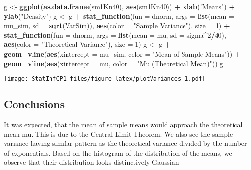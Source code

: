 \documentclass[]{article}
\newenvironment{Shaded}{\begin{snugshade}}{\end{snugshade}}
\newcommand{\DataTypeTok}[1]{\textcolor[rgb]{0.13,0.29,0.53}{#1}}
\newcommand{\DecValTok}[1]{\textcolor[rgb]{0.00,0.00,0.81}{#1}}
\newcommand{\KeywordTok}[1]{\textcolor[rgb]{0.13,0.29,0.53}{\textbf{#1}}}
\newcommand{\NormalTok}[1]{#1}
\newcommand{\OperatorTok}[1]{\textcolor[rgb]{0.81,0.36,0.00}{\textbf{#1}}}
\newcommand{\StringTok}[1]{\textcolor[rgb]{0.31,0.60,0.02}{#1}}
\begin{document}
\begin{Shaded}
\begin{Highlighting}[]
\NormalTok{g <-}\StringTok{ }\KeywordTok{ggplot}\NormalTok{(}\KeywordTok{as.data.frame}\NormalTok{(sm1Kn40), }\KeywordTok{aes}\NormalTok{(sm1Kn40)) }\OperatorTok{+}
\StringTok{        }\KeywordTok{xlab}\NormalTok{(}\StringTok{"Means"}\NormalTok{) }\OperatorTok{+}
\StringTok{        }\KeywordTok{ylab}\NormalTok{(}\StringTok{"Density"}\NormalTok{)}
\NormalTok{g <-}\StringTok{ }\NormalTok{g }\OperatorTok{+}\StringTok{ }\KeywordTok{stat_function}\NormalTok{(}\DataTypeTok{fun =}\NormalTok{ dnorm,}
                       \DataTypeTok{args =} \KeywordTok{list}\NormalTok{(}\DataTypeTok{mean =}\NormalTok{ mu_sim, }
                                   \DataTypeTok{sd =} \KeywordTok{sqrt}\NormalTok{(VarSim)),}
                       \KeywordTok{aes}\NormalTok{(}\DataTypeTok{color =} \StringTok{"Sample Variance"}\NormalTok{), }
                       \DataTypeTok{size =} \DecValTok{1}\NormalTok{) }\OperatorTok{+}
\StringTok{        }\KeywordTok{stat_function}\NormalTok{(}\DataTypeTok{fun =}\NormalTok{ dnorm,}
                      \DataTypeTok{args =} \KeywordTok{list}\NormalTok{(}\DataTypeTok{mean =}\NormalTok{ mu, }
                                  \DataTypeTok{sd =}\NormalTok{ sigma}\OperatorTok{^}\DecValTok{2}\OperatorTok{/}\DecValTok{40}\NormalTok{),}
                      \KeywordTok{aes}\NormalTok{(}\DataTypeTok{color =} \StringTok{"Theoretical Variance"}\NormalTok{), }
                       \DataTypeTok{size =} \DecValTok{1}\NormalTok{)}
\NormalTok{g <-}\StringTok{ }\NormalTok{g }\OperatorTok{+}\StringTok{ }\KeywordTok{geom_vline}\NormalTok{(}\KeywordTok{aes}\NormalTok{(}\DataTypeTok{xintercept =}\NormalTok{ mu_sim, }\DataTypeTok{color =} 
                                \StringTok{"Mean of Sample Means"}\NormalTok{)) }\OperatorTok{+}
\StringTok{        }\KeywordTok{geom_vline}\NormalTok{(}\KeywordTok{aes}\NormalTok{(}\DataTypeTok{xintercept =}\NormalTok{ mu, }\DataTypeTok{color =} 
                               \StringTok{"Mu (Theoretical Mean)"}\NormalTok{))}
\NormalTok{g}
\end{Highlighting}
\end{Shaded}

\texttt{[image: StatInfCP1\_files/figure-latex/plotVariances-1.pdf]}

\hypertarget{conclusions}{%
\subsection{Conclusions}\label{conclusions}}

It was expected, that the mean of sample means would approach the
theoretical mean mu. This is due to the Central Limit Theorem. We also
see the sample variance having similar pattern as the theoretical
variance divided by the number of exponentials. Based on the histogram
of the distribution of the means, we observe that their distribution
looks distinctively Gaussian
\end{document}
